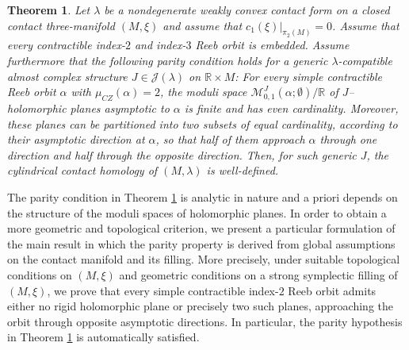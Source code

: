 \documentclass{amsart}
\newcommand{\R}{\mathbb{R}}
\newtheorem{theorem}{Theorem}[section]
\begin{document}
\begin{theorem}\label{main1}
Let $\lambda$ be a nondegenerate weakly convex contact form on a closed
contact three-manifold $(M,\xi)$ and assume that $c_1(\xi)|_{\pi_2(M)}=0$.
Assume that every contractible index-$2$ and index-$3$ Reeb orbit is embedded. Assume furthermore that the following parity condition holds for a generic $\lambda$-compatible almost complex structure $J\in \mathcal J(\lambda)$ on $\R\times M$: For every simple contractible Reeb orbit 
$\alpha$ with $\mu_{CZ}(\alpha)=2$, the moduli space $
\mathcal{M}^J_{0,1}(\alpha;\emptyset)/\mathbb{R}
$
of $J$--holomorphic planes asymptotic to $\alpha$ is finite and has even
cardinality. Moreover, these planes can be partitioned into two subsets
of equal cardinality, according to their asymptotic direction at $\alpha$,
so that half of them approach $\alpha$ through one direction and half
through the opposite direction.
 Then, for such generic $J$, the cylindrical contact homology of $(M,\lambda)$
is well-defined.
\end{theorem}

The parity condition in Theorem \ref{main1} is analytic in nature and a priori
depends on the structure of the moduli spaces of holomorphic planes.
In order to obtain a more geometric and topological criterion,
we present a particular formulation of the main result in which
the parity property is derived from global assumptions on the
contact manifold and its filling.
More precisely, under suitable topological conditions on $(M,\xi)$
and geometric conditions on a strong symplectic filling of $(M,\xi)$,
we prove that every simple contractible index-$2$ Reeb orbit admits
either no rigid holomorphic plane or precisely two such planes,
approaching the orbit through opposite asymptotic directions.
In particular, the parity hypothesis in Theorem \ref{main1} is automatically satisfied.
\end{document}

